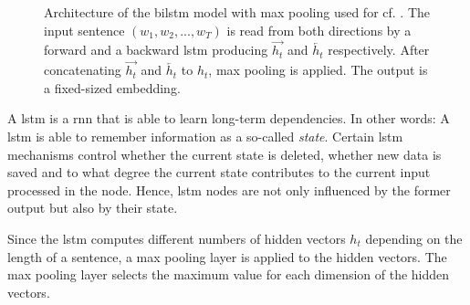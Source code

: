 \begin{figure}[htp] %
    \centering
    
    \caption{Architecture of the \ac{bilstm} model with max pooling used for \infersent{} cf. \cite{inferSent2018}.
    The input sentence $(w_1, w_2, ..., w_T)$ is read from both directions by a forward and a backward \ac{lstm} 
    producing $\overrightarrow{h_t}$ and $\overleftarrow{h_t}$ respectively.
    After concatenating $\overrightarrow{h_t}$ and $\overleftarrow{h_t}$ to $h_t$, max pooling is applied.
    The output is a fixed-sized embedding.
    }
    \label{fig:infersent_bilstm}
\end{figure}

A \ac{lstm} is a \ac{rnn} that is able to learn long-term dependencies.
In other words: 
A \ac{lstm} is able to remember information as a so-called \textit{state}.
Certain \ac{lstm} mechanisms control whether the current state is deleted, whether new data is saved and 
to what degree the current state contributes to the current input processed in the node.
Hence, \ac{lstm} nodes are not only influenced by the former output but also by their state.

Since the \ac{lstm} computes different numbers of hidden vectors $h_t$ depending on the length of a sentence, a max pooling layer is applied to the hidden vectors.
The max pooling layer selects the maximum value for each dimension of the hidden vectors.

